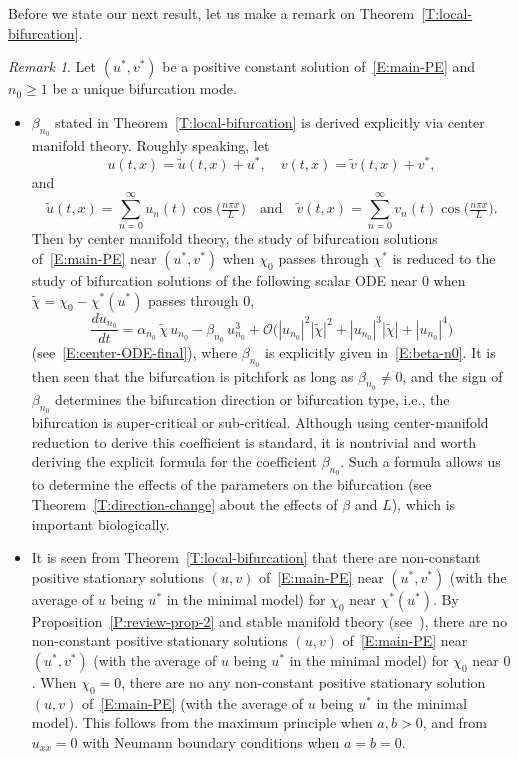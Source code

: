 \documentclass[11pt]{article} %
\theoremstyle{remark}
\newtheorem{remark}{Remark}[section]
\theoremstyle{remark}
\numberwithin{equation}{section}
\numberwithin{figure}{section}
\numberwithin{table}{section}
\begin{document}
Before we state our next result, let us make a remark on
Theorem~\ref{T:local-bifurcation}.

\begin{remark}\label{R:local-bifurcation-minimal}  Let $(u^*,v^*)$
  be a positive constant solution of~\eqref{E:main-PE} and $n_0
  \ge 1$ be a unique bifurcation mode.
  \begin{itemize}
    \item[(1)] $\beta_{n_0}$ stated in Theorem~\ref{T:local-bifurcation} is
      derived explicitly via center manifold theory. Roughly speaking, let
      \[
        u(t,x)=\tilde{u}(t,x)+u^*,\quad v(t,x)=\tilde{v}(t,x)+v^*,
      \]
      and
      \[
        \tilde{u}(t,x) = \sum_{n=0}^\infty u_n(t)\cos\Big(\tfrac{n\pi x}{L}\Big) \quad \text{and} \quad
        \tilde{v}(t,x) = \sum_{n=0}^\infty v_n(t)\cos\Big(\tfrac{n\pi
        x}{L}\Big).
      \]
      Then by center manifold theory, the study of bifurcation solutions
      of~\eqref{E:main-PE} near $(u^*,v^*)$ when $\chi_0$ passes through
      $\chi^*$ is reduced to the study of bifurcation solutions of the following
      scalar ODE near $0$ when $\tilde{\chi} = \chi_0 - \chi^*(u^*)$ passes
      through $0$,
      \[
        \frac{d u_{n_0}}{dt}
        = \alpha_{n_0}\,\tilde{\chi}\,u_{n_0}
        - \beta_{n_0}\,u_{n_0}^3
        + \mathcal{O}\big( |u_{n_0}|^2 |\tilde{\chi}|^2+ |u_{n_0}|^3 |\tilde{\chi}|+
        |u_{n_0}|^4\big)
      \]
      (see~\eqref{E:center-ODE-final}), where $\beta_{n_0}$ is explicitly given
      in~\eqref{E:beta-n0}. It is then seen that the bifurcation is pitchfork as
      long as $\beta_{n_0}\not = 0$, and the sign of $\beta_{n_0}$ determines
      the bifurcation direction or bifurcation type, i.e., the bifurcation is
      super-critical or sub-critical. Although using center-manifold reduction
      to derive this coefficient is standard, it is nontrivial and worth
      deriving the explicit formula for the coefficient $\beta_{n_0}$. Such a
      formula allows us to determine the effects of the parameters on the
      bifurcation (see Theorem~\ref{T:direction-change} about the effects of
      $\beta$ and $L$), which is important biologically.

    \item[(2)] It is seen from Theorem~\ref{T:local-bifurcation} that there are
      non-constant positive stationary solutions $(u,v)$ of~\eqref{E:main-PE}
      near $(u^*,v^*)$ (with the average of $u$ being $u^*$ in the minimal
      model) for $\chi_0$ near $\chi^*(u^*)$. By
      Proposition~\ref{P:review-prop-2} and stable manifold theory
      (see~\cite[Theorem~5.1.1]{henry:81:geometric}), there are no non-constant
      positive stationary solutions $(u,v)$ of~\eqref{E:main-PE} near
      $(u^*,v^*)$ (with the average of $u$ being $u^*$ in the minimal model) for
      $\chi_0$ near $0$. When $\chi_0 = 0$, there are no any non-constant
      positive stationary solution $(u,v)$ of~\eqref{E:main-PE} (with the
      average of $u$ being $u^*$ in the minimal model). This follows from the
      maximum principle when $a, b > 0$, and from $u_{xx} = 0$ with Neumann
      boundary conditions when $a = b = 0$.


\end{itemize}
\end{remark}
\end{document}
